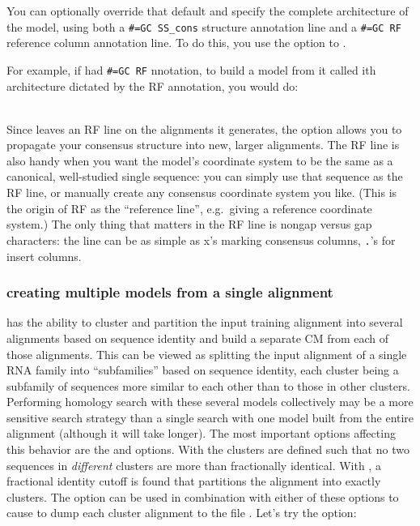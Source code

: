 You can optionally override that default and specify the complete
architecture of the model, using both a {\small\verb+#=GC SS_cons+}
structure annotation line and a {\small\verb+#=GC RF+} reference
column annotation line.  To do this, you use the  option to
.

For example, if  had {\small\verb+#=GC RF+}
nnotation, to build a model from it called  
ith architecture dictated by the RF annotation, you
would do:

\\

Since  leaves an RF line on the alignments it generates,
the  option allows you to propagate your consensus
structure into new, larger alignments. The RF line is also handy when
you want the model's coordinate system to be the same as a canonical,
well-studied single sequence: you can simply use that sequence as the
RF line, or manually create any consensus coordinate system you like.
(This is the origin of RF as the ``reference line'', e.g.\ giving a
reference coordinate system.) The only thing that matters in the RF
line is nongap versus gap characters: the line can be as simple as x's
marking consensus columns, \verb+.+'s for insert columns.

\subsubsection{creating multiple models from a single alignment}
 has the ability to cluster and partition the input training
alignment into several alignments based on sequence identity and build
a separate CM from each of those alignments. This can be viewed as splitting
the input alignment of a single RNA family into ``subfamilies'' based on
sequence identity, each cluster being a subfamily of sequences more
similar to each other than to those in other clusters.
Performing homology search with these several models
collectively may be a more sensitive search strategy than a single
search with one model built from the entire alignment (although it
will take longer). The most important options affecting this behavior
are the  and  options. With
 the clusters are defined such that no two
sequences in \emph{different} clusters are more than 
fractionally identical. With , a fractional identity
cutoff is found that partitions the alignment into exactly 
clusters. The  option can be used in combination
with either of these options to cause  to dump each
cluster alignment to the file . Let's try the 
 option: 


